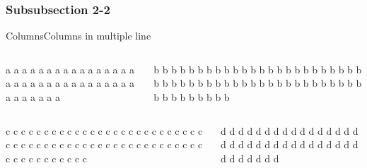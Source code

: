 \documentclass[a4paper,11pt]{beamer}
\begin{document}
\subsubsection{Subsubsection 2-2}

	\begin{frame}{Columns}{Columns in multiple line}
		\begin{columns}
			\begin{column}{.4\textwidth}
				a a a a a a a a a a a a a a a a a a a a a a a a a a a a a a a a a a a a a a a
			\end{column}
			\begin{column}{.6\textwidth}
				b b b b b b b b b b b b b b b b b b b b b b b b b b b b b b b b b b b b b b b b b b b b b b b b b b b b b b b b b
			\end{column}
		\end{columns}
		\vspace{.5cm}
		\begin{columns}
			\begin{column}{.6\textwidth}
				c c c c c c c c c c c c c c c c c c c c c c c c c c c c c c c c c c c c c c c c c c c c c c c c c c c c c c c c c c c c c c c 
			\end{column}
			\begin{column}{.4\textwidth}
				d d d d d d d d d d d d d d d d d d d d d d d d d d d d d d d d d d d d d d d
			\end{column}
		\end{columns}
	\end{frame}
\end{document}
